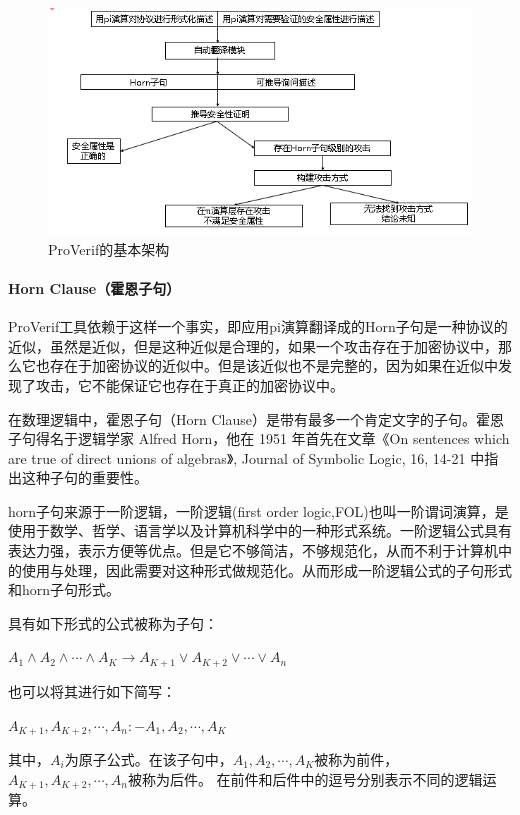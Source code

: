 \documentclass[cs4size,a4pape,UTF8]{ctexart}
\numberwithin{equation}{section}
\numberwithin{table}{section}
\numberwithin{figure}{section}
\begin{document}
\begin{figure}[h!]
\centering
\includegraphics[width=0.8\linewidth]{figure/5}
\caption{ProVerif的基本架构\cite{7}}
\label{fig:5}
\end{figure}

\paragraph{Horn Clause（霍恩子句）}

ProVerif工具依赖于这样一个事实，即应用pi演算翻译成的Horn子句是一种协议的近似，虽然是近似，但是这种近似是合理的，如果一个攻击存在于加密协议中，那么它也存在于加密协议的近似中。但是该近似也不是完整的，因为如果在近似中发现了攻击，它不能保证它也存在于真正的加密协议中。

在数理逻辑中，霍恩子句（Horn Clause）是带有最多一个肯定文字的子句。霍恩子句得名于逻辑学家 Alfred Horn，他在 1951 年首先在文章《On sentences which are true of direct unions of algebras》, Journal of Symbolic Logic, 16, 14-21 中指出这种子句的重要性。

horn子句来源于一阶逻辑，一阶逻辑(first order logic,FOL)也叫一阶谓词演算，是使用于数学、哲学、语言学以及计算机科学中的一种形式系统。一阶逻辑公式具有表达力强，表示方便等优点。但是它不够简洁，不够规范化，从而不利于计算机中的使用与处理，因此需要对这种形式做规范化。从而形成一阶逻辑公式的子句形式和horn子句形式。

\begin{definition}
\label{clause}
具有如下形式的公式被称为子句：

$A_{1}\wedge{A_{2}}\wedge\cdots\wedge{A_{K}}\rightarrow{A_{K+1}}\vee{A_{K+2}}\vee\cdots\vee{A_{n}}$

也可以将其进行如下简写：

${A_{K+1}},{A_{K+2}},\cdots,{A_{n}}:-A_{1},{A_{2}},\cdots,{A_{K}}$

其中，$A_{i}$为原子公式。在该子句中，$A_{1},{A_{2}},\cdots,{A_{K}}$被称为前件，${A_{K+1}},{A_{K+2}},\cdots,{A_{n}}$被称为后件。
在前件和后件中的逗号分别表示不同的逻辑运算。

\end{definition}
\end{document}
